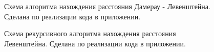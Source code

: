 \documentclass[a4paper]{article}
\begin{document}
	\begin{figure}[h]
		
		\caption{Схема алгоритма нахождения расстояния Дамерау - Левенштейна. Сделана по реализации кода в приложении. \centering}
		\label{image2}
	\end{figure}

	\begin{figure}[h]
		
		\caption{Схема рекурсивного алгоритма нахождения расстояния Левенштейна. Сделана по реализации кода в приложении. \centering}
		\label{image3}
	\end{figure}
\end{document}
